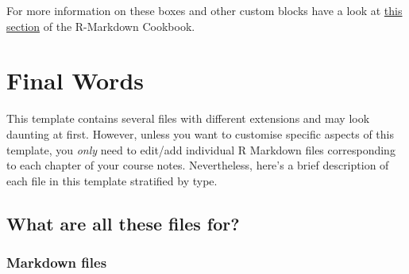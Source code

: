 \documentclass[
  oneside]{krantz}
\theoremstyle{definition}
\theoremstyle{definition}
\theoremstyle{definition}
\theoremstyle{remark}
\begin{document}
For more information on these boxes and other custom blocks have a look at \href{https://bookdown.org/yihui/rmarkdown-cookbook/custom-blocks.html}{this section} of the R-Markdown Cookbook.

\hypertarget{final-words}{%
\chapter{Final Words}\label{final-words}}

This template contains several files with different extensions and may look daunting at first. However, unless you want to customise specific aspects of this template, you \emph{only} need to edit/add individual R Markdown files corresponding to each chapter of your course notes. Nevertheless, here's a brief description of each file in this template stratified by type.

\hypertarget{what-are-all-these-files-for}{%
\section{What are all these files for?}\label{what-are-all-these-files-for}}

\hypertarget{markdown-files}{%
\subsection*{Markdown files}\label{markdown-files}}
\end{document}
